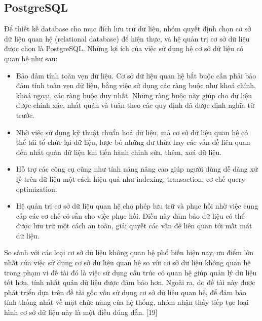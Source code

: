 \subsection{PostgreSQL}
Để thiết kế database cho mục đích lưu trữ dữ liệu, nhóm quyết định chọn cơ sở
dữ liệu quan hệ (relational database) để hiện thực, và hệ quản trị cơ sở dữ liệu
được chọn là PostgreSQL. Những lợi ích của việc sử dụng hệ cơ sở dữ liệu có quan
hệ như sau:
\begin{itemize}
    \item Bảo đảm tính toàn vẹn dữ liệu. Cơ sở dữ liệu quan hệ bắt buộc cần phải bảo đảm
          tính toàn vẹn dữ liệu, bằng việc sử dụng các ràng buộc như khoá chính, khoá
          ngoại, các ràng buộc duy nhất. Những ràng buộc này giúp cho dữ liệu được chính
          xác, nhất quán và tuân theo các quy định đã được định nghĩa từ trước.
    \item Nhờ việc sử dụng kỹ thuật chuẩn hoá dữ liệu, mà cơ sở dữ liệu quan hệ có thể
          tái tổ chức lại dữ liệu, lược bỏ những dư thừa hay các vấn đề liên quan đến
          nhất quán dữ liệu khi tiến hành chỉnh sửa, thêm, xoá dữ liệu.
    \item Hỗ trợ các công cụ cũng như tính năng nâng cao giúp người dùng dễ dàng xử lý
          trên dữ liệu một cách hiệu quả như indexing, transaction, cơ chế query
          optimization.
    \item Hệ quản trị cơ sở dữ liệu quan hệ cho phép lưu trữ và phục hồi nhờ việc cung
          cấp các cơ chế có sẵn cho việc phục hồi. Điều này đảm bảo dữ liệu có thể được
          lưu trữ một cách an toàn, giải quyết các vấn đề liên quan tới mất mát dữ liệu.
\end{itemize}
So sánh với các loại cơ sở dữ liệu không quan hệ phổ biến hiện nay, ưu điểm lớn nhất của việc sử dụng cơ sở dữ liệu quan hệ so với cơ sở dữ liệu không quan hệ trong phạm vi đề tài đó là việc sử dụng cấu trúc có quan hệ giúp quản lý dữ liệu tốt hơn, tính nhất quán dữ liệu được đảm bảo hơn. Ngoài ra, do đề tài này được phát triển dựa trên đề tài gốc vốn sử dụng cơ sở dữ liệu quan hệ, để đảm bảo tính thống nhất về mặt chức năng của hệ thống, nhóm nhận thấy tiếp tục loại hình cơ sở dữ liệu này là một điều đúng đắn. [19]